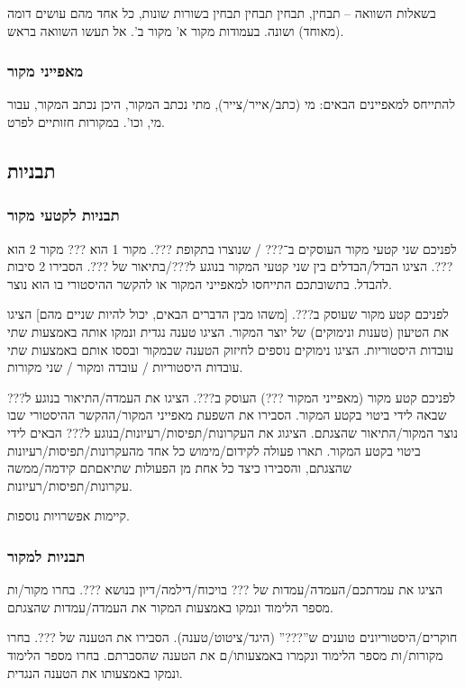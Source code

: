 \documentclass[]{../../../../tex/classes/styledArticle}
\begin{document}
	בשאלות השוואה – תבחין, תבחין תבחין תבחין בשורות שונות, כל אחד מהם עושים דומה (מאוחד) ושונה. בעמודות מקור א' מקור ב'. אל תעשו השוואה בראש. 
	
	\subsubsection*{מאפייני מקור}
	להתייחס למאפיינים הבאים: מי (כתב/אייר/צייר), מתי נכתב המקור, היכן נכתב המקור, עבור מי, וכו'. במקורות חזותיים לפרט. 
	
	\subsection*{תבניות}
	\subsubsection*{תבניות לקטעי מקור}
	לפניכם שני קטעי מקור העוסקים ב־??? / שנוצרו בתקופת ???. מקור 1 הוא ??? מקור 2 הוא ???. הציגו הבדל/הבדלים בין שני קטעי המקור בנוגע ל???/בתיאור של ???. הסבירו 2 סיבות להבדל. בתשובתכם התייחסו למאפייני המקור או להקשר ההיסטורי בו הוא נוצר. 
	
	לפניכם קטע מקור שעוסק ב???. [משהו מבין הדברים הבאים, יכול להיות שניים מהם] הציגו את הטיעון (טענות ונימוקים) של יוצר המקור. הציגו טענה נגדית ונמקו אותה באמצעות שתי עובדות היסטוריות. הציגו נימוקים נוספים לחיזוק הטענה שבמקור ובססו אותם באמצעות שתי עובדות היסטוריות / עובדה ומקור / שני מקורות. 
	
	לפניכם קטע מקור (מאפייני המקור ???) העוסק ב???. הציגו את העמדה/התיאור בנוגע ל??? שבאה לידי ביטוי בקטע המקור. הסבירו את השפעת מאפייני המקור/ההקשר ההיסטורי שבו נוצר המקור/התיאור שהצגתם. הציגוג את העקרונות/תפיסות/רעיונות/בנוגע ל??? הבאים לידי ביטוי בקטע המקור. תארו פעולה לקידום/מימוש כל אחד מהעקרונות/תפיסות/רעיונות שהצגתם, והסבירו כיצד כל אחת מן הפעולות שתיאםתם קידמה/ממשה עקרונות/תפיסות/רעיונות. 
	
	קיימות אפשרויות נוספות. 
	
	\subsubsection*{תבניות למקור}
	הציגו את עמדתכם/העמדה/עמדות של ??? בויכוח/דילמה/דיון בנושא ???. בחרו מקור/ות מספר הלימוד ונמקו באמצעות המקור את העמדה/עמדות שהצגתם. 
	
	חוקרים/היסטוריונים טוענים ש''???'' (היגד/ציטוט/טענה). הסבירו את הטענה של ???. בחרו מקורות/ות מספר הלימוד ונקמרו באמצעותו/ם את הטענה שהסברתם. בחרו מספר הלימוד ונמקו באמצעותו את הטענה הנגדית. 
	
\end{document}
